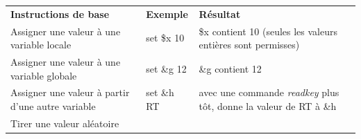 \documentclass[
]{book}
\begin{document}
\begin{longtable}[]{@{}lll@{}}
\toprule
\endhead
\begin{minipage}[t]{0.32\columnwidth}\raggedright
\textbf{Instructions de base}\strut
\end{minipage} & \begin{minipage}[t]{0.20\columnwidth}\raggedright
\textbf{Exemple}\strut
\end{minipage} & \begin{minipage}[t]{0.40\columnwidth}\raggedright
\textbf{Résultat}\strut
\end{minipage}\tabularnewline
\begin{minipage}[t]{0.32\columnwidth}\raggedright
Assigner une valeur à une variable locale\strut
\end{minipage} & \begin{minipage}[t]{0.20\columnwidth}\raggedright
set \$x 10\strut
\end{minipage} & \begin{minipage}[t]{0.40\columnwidth}\raggedright
\$x contient 10 (seules les valeurs entières sont permisses)\strut
\end{minipage}\tabularnewline
\begin{minipage}[t]{0.32\columnwidth}\raggedright
Assigner une valeur à une variable globale\strut
\end{minipage} & \begin{minipage}[t]{0.20\columnwidth}\raggedright
set \&g 12\strut
\end{minipage} & \begin{minipage}[t]{0.40\columnwidth}\raggedright
\&g contient 12\strut
\end{minipage}\tabularnewline
\begin{minipage}[t]{0.32\columnwidth}\raggedright
Assigner une valeur à partir d'une autre variable\strut
\end{minipage} & \begin{minipage}[t]{0.20\columnwidth}\raggedright
set \&h RT\strut
\end{minipage} & \begin{minipage}[t]{0.40\columnwidth}\raggedright
avec une commande \emph{readkey} plus tôt, donne la valeur de RT à
\&h\strut
\end{minipage}\tabularnewline
\begin{minipage}[t]{0.32\columnwidth}\raggedright
Tirer une valeur aléatoire\strut
\end{minipage} & \begin{minipage}[t]{0.20\columnwidth}\raggedright

\end{minipage}
\end{longtable}
\end{document}
